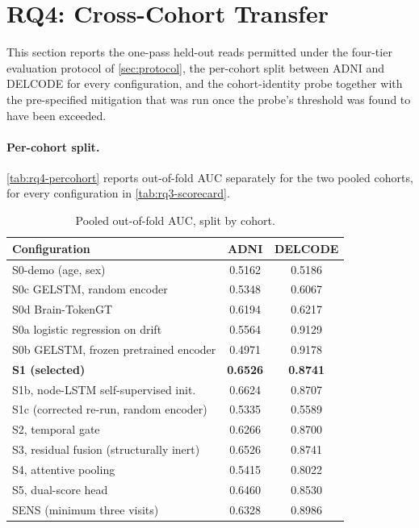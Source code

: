 \section{RQ4: Cross-Cohort Transfer}\label{sec:rq4}

This section reports the one-pass held-out reads permitted under the four-tier evaluation
protocol of \autoref{sec:protocol}, the per-cohort split between \ac{ADNI} and \ac{DELCODE}
for every configuration, and the cohort-identity probe together with the pre-specified
mitigation that was run once the probe's threshold was found to have been exceeded.

\paragraph{Per-cohort split.} \autoref{tab:rq4-percohort} reports out-of-fold \ac{AUC}
separately for the two pooled cohorts, for every configuration in \autoref{tab:rq3-scorecard}.

\begin{table}[htbp]
\centering
\small
\caption{Pooled out-of-fold \ac{AUC}, split by cohort.}
\label{tab:rq4-percohort}
\begin{tabular}{@{}lcc@{}}
\toprule
Configuration & \ac{ADNI} & \ac{DELCODE} \\
\midrule
S0-demo (age, sex) & 0.5162 & 0.5186 \\
S0c \ac{GELSTM}, random encoder & 0.5348 & 0.6067 \\
S0d Brain-TokenGT & 0.6194 & 0.6217 \\
S0a logistic regression on drift & 0.5564 & 0.9129 \\
S0b \ac{GELSTM}, frozen pretrained encoder & 0.4971 & 0.9178 \\
\textbf{S1 (selected)} & \textbf{0.6526} & \textbf{0.8741} \\
S1b, node-\ac{LSTM} self-supervised init. & 0.6624 & 0.8707 \\
S1c (corrected re-run, random encoder) & 0.5335 & 0.5589 \\
S2, temporal gate & 0.6266 & 0.8700 \\
S3, residual fusion (structurally inert) & 0.6526 & 0.8741 \\
S4, attentive pooling & 0.5415 & 0.8022 \\
S5, dual-score head & 0.6460 & 0.8530 \\
SENS (minimum three visits) & 0.6328 & 0.8986 \\
\bottomrule
\end{tabular}
\end{table}

